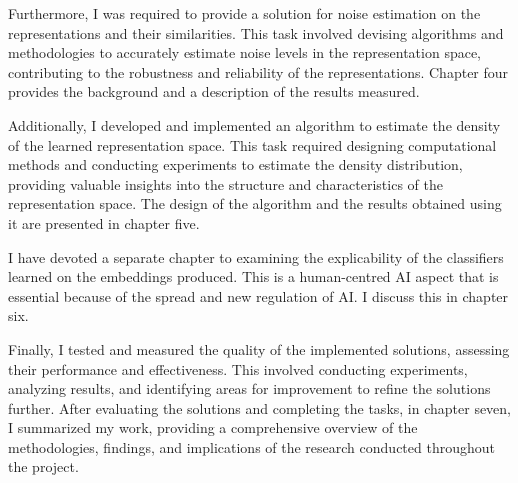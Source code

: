 Furthermore, I was required to provide a solution for noise estimation on the representations and their similarities. This task involved devising algorithms and methodologies to accurately estimate noise levels in the representation space, contributing to the robustness and reliability of the representations. Chapter four provides the background and a description of the results measured.

Additionally, I developed and implemented an algorithm to estimate the density of the learned representation space. This task required designing computational methods and conducting experiments to estimate the density distribution, providing valuable insights into the structure and characteristics of the representation space. The design of the algorithm and the results obtained using it are presented in chapter five. 

I have devoted a separate chapter to examining the explicability of the classifiers learned on the embeddings produced. This is a human-centred AI aspect that is essential because of the spread and new regulation of AI. I discuss this in chapter six.

Finally, I tested and measured the quality of the implemented solutions, assessing their performance and effectiveness. This involved conducting experiments, analyzing results, and identifying areas for improvement to refine the solutions further. After evaluating the solutions and completing the tasks, in chapter seven, I summarized my work, providing a comprehensive overview of the methodologies, findings, and implications of the research conducted throughout the project. 
